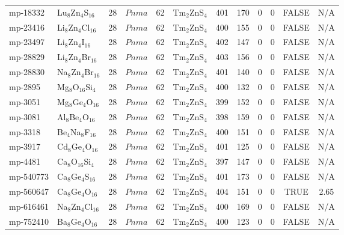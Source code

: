 {\begin{longtable}{llcccccccccc}
    mp-18332 & Lu$_{8}$Zn$_{4}$S$_{16}$ & 28    & $Pnma$ & 62    & Tm$_{2}$ZnS$_{4}$ & 401   & 170   & 0     & 0     & FALSE & N/A \\
    mp-23416 & Li$_{8}$Zn$_{4}$Cl$_{16}$ & 28    & $Pnma$ & 62    & Tm$_{2}$ZnS$_{4}$ & 400   & 155   & 0     & 0     & FALSE & N/A \\
    mp-23497 & Li$_{8}$Zn$_{4}$I$_{16}$ & 28    & $Pnma$ & 62    & Tm$_{2}$ZnS$_{4}$ & 402   & 147   & 0     & 0     & FALSE & N/A \\
    mp-28829 & Li$_{8}$Zn$_{4}$Br$_{16}$ & 28    & $Pnma$ & 62    & Tm$_{2}$ZnS$_{4}$ & 403   & 156   & 0     & 0     & FALSE & N/A \\
    mp-28830 & Na$_{8}$Zn$_{4}$Br$_{16}$ & 28    & $Pnma$ & 62    & Tm$_{2}$ZnS$_{4}$ & 401   & 140   & 0     & 0     & FALSE & N/A \\
    mp-2895 & Mg$_{8}$O$_{16}$Si$_{4}$ & 28    & $Pnma$ & 62    & Tm$_{2}$ZnS$_{4}$ & 400   & 132   & 0     & 0     & FALSE & N/A \\
    mp-3051 & Mg$_{8}$Ge$_{4}$O$_{16}$ & 28    & $Pnma$ & 62    & Tm$_{2}$ZnS$_{4}$ & 399   & 152   & 0     & 0     & FALSE & N/A \\
    mp-3081 & Al$_{8}$Be$_{4}$O$_{16}$ & 28    & $Pnma$ & 62    & Tm$_{2}$ZnS$_{4}$ & 398   & 159   & 0     & 0     & FALSE & N/A \\
    mp-3318 & Be$_{4}$Na$_{8}$F$_{16}$ & 28    & $Pnma$ & 62    & Tm$_{2}$ZnS$_{4}$ & 400   & 151   & 0     & 0     & FALSE & N/A \\
    mp-3917 & Cd$_{8}$Ge$_{4}$O$_{16}$ & 28    & $Pnma$ & 62    & Tm$_{2}$ZnS$_{4}$ & 401   & 125   & 0     & 0     & FALSE & N/A \\
    mp-4481 & Ca$_{8}$O$_{16}$Si$_{4}$ & 28    & $Pnma$ & 62    & Tm$_{2}$ZnS$_{4}$ & 397   & 147   & 0     & 0     & FALSE & N/A \\
    mp-540773 & Ca$_{8}$Ge$_{4}$S$_{16}$ & 28    & $Pnma$ & 62    & Tm$_{2}$ZnS$_{4}$ & 401   & 173   & 0     & 0     & FALSE & N/A \\
    mp-560647 & Ca$_{8}$Ge$_{4}$O$_{16}$ & 28    & $Pnma$ & 62    & Tm$_{2}$ZnS$_{4}$ & 404   & 151   & 0     & 0     & TRUE  & 2.65  \\
    mp-616461 & Na$_{8}$Zn$_{4}$Cl$_{16}$ & 28    & $Pnma$ & 62    & Tm$_{2}$ZnS$_{4}$ & 400   & 169   & 0     & 0     & FALSE & N/A \\
    mp-752410 & Ba$_{8}$Ge$_{4}$O$_{16}$ & 28    & $Pnma$ & 62    & Tm$_{2}$ZnS$_{4}$ & 400   & 123   & 0     & 0     & FALSE & N/A \\

\end{longtable}}
